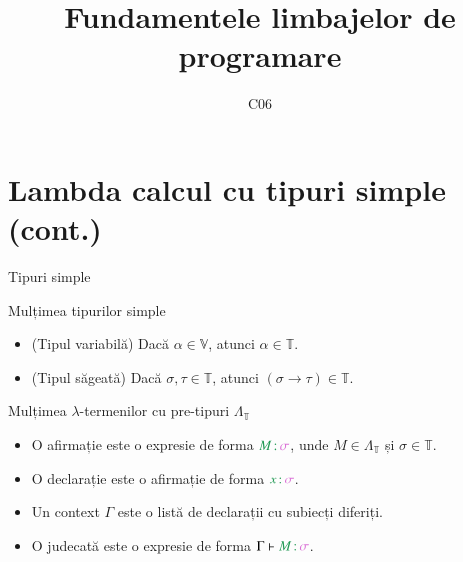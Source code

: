 \documentclass[xcolor=pdftex,romanian,colorlinks]{beamer}
\title[FLP]{Fundamentele limbajelor de programare}
\subtitle{C06}
\date{}
\begin{document}
\begin{frame}
  \titlepage
\end{frame}

\setlength{\leftmargini}{12pt}


\section{\color{section-color} Lambda calcul cu tipuri simple (cont.)}

\begin{frame}{Tipuri simple}

Mulțimea  \alert{tipurilor simple}  \hspace{.2cm}
\vspace{-.2cm}
\begin{itemize}
	\item \alert{(Tipul variabilă)} Dacă $\alpha \in \mathbb{V}$, atunci $\alpha \in \mathbb{T}$.
	\item \alert{(Tipul săgeată)} Dacă $\sigma,\tau \in \mathbb{T}$, atunci  $(\sigma \rightarrow \tau) \in \mathbb{T}$.
\end{itemize}


Mulțimea \alert{$\lambda$-termenilor cu pre-tipuri $\Lambda_\mathbb{T}$} \hspace{.2cm}


\begin{itemize}
	\item O \alert{afirmație} este o expresie de forma $\type{M}{\sigma}$, unde $M \in \Lambda_\mathbb{T}$ și $\sigma\in \mathbb{T}$.\\
	\item O \alert{declarație} este o afirmație de forma $\type{x}{\sigma}$.
	\item Un \alert{context} $\Gamma$ este o listă de declarații cu subiecți diferiți.
	\item O \alert{judecată} este o expresie de forma $\Gamma \vdash \type{M}{\sigma}$.
\end{itemize}


\end{frame}
\end{document}
